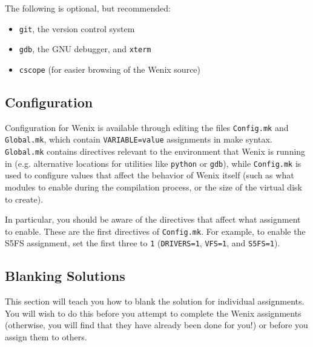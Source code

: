 The following is optional, but recommended:
\begin{itemize}
\item \texttt{git}, the version control system
\item \texttt{gdb}, the GNU debugger, and \texttt{xterm} %
\item \texttt{cscope} (for easier browsing of the Wenix source)
\end{itemize}


\subsection{Configuration}
Configuration for Wenix is available through editing the files \texttt{Config.mk} and \texttt{Global.mk}, which contain \texttt{VARIABLE=value} assignments in make syntax.  \texttt{Global.mk} contains directives relevant to the environment that Wenix is running in (e.g. alternative locations for utilities like \texttt{python} or \texttt{gdb}), while \texttt{Config.mk} is used to configure values that affect the behavior of Wenix itself (such as what modules to enable during the compilation process, or the size of the virtual disk to create).

In particular, you should be aware of the directives that affect what assignment to enable.  These are the first directives of \texttt{Config.mk}.  For example, to enable the S5FS assignment, set the first three to \texttt{1} (\texttt{DRIVERS=1}, \texttt{VFS=1}, and \texttt{S5FS=1}).

\subsection{Blanking Solutions}

This section will teach you how to blank the solution for individual assignments.  You will wish to do this before you attempt to complete the Wenix assignments (otherwise, you will find that they have already been done for you!) or before you assign them to others.


